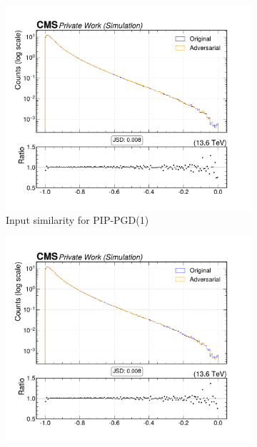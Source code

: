 \begin{figure}[htbp]
  \centering
  \begin{subfigure}[t]{0.32\textwidth}
    \includegraphics[width=\linewidth]{media/output/features/compare/combined_it_1/cmp_cpf_arr_Cpfcan_ptrel.pdf}
    \caption*{Input similarity for PIP-PGD(1)}
  \end{subfigure}\hfill
  \begin{subfigure}[t]{0.32\textwidth}
    \includegraphics[width=\linewidth]{media/output/features/compare/combined_it_2/cmp_cpf_arr_Cpfcan_ptrel.pdf}

\end{subfigure}
\end{figure}
